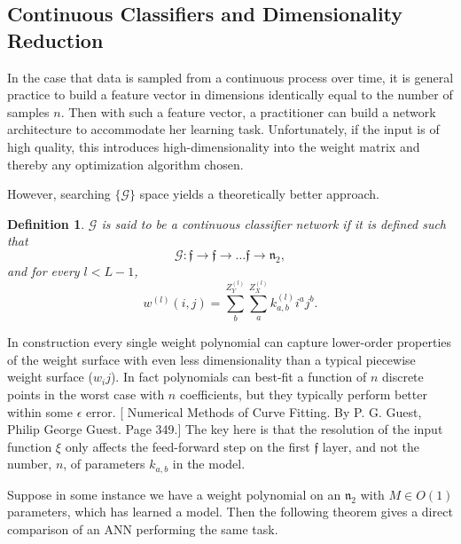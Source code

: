 \documentclass{article}
\newtheorem{definition}[theorem]{Definition}
\begin{document}
\subsection{Continuous Classifiers and Dimensionality Reduction}
In the case that data is sampled from a continuous process over time, it is general practice
to build a feature vector in dimensions identically equal to the number of samples $n$. Then with such a feature vector, a practitioner can build a network architecture to accommodate her learning task. Unfortunately, if the input is of high quality, this introduces high-dimensionality into the weight matrix and thereby any optimization algorithm chosen.




However, searching $\{\mathcal{G}\}$ space yields a theoretically better approach.
\begin{definition}
    $\mathcal{G}$ is said to be a continuous classifier network if it is defined such that
    \begin{equation}
        \mathcal{G}: \mathfrak{f} \to \mathfrak{f} \to \dots \mathfrak{f} \to \mathfrak{n}_2,
    \end{equation}
    and for every $l < L-1$,
    \begin{equation}
w^{(l)}(i,j) = 
    \sum_{b}^{Z^{(l)}_Y} \sum_{a}^{Z^{(l)}_X} k^{(l)}_{a,b}i^{a}j^{b}.
\end{equation}
\end{definition}
In construction every single weight polynomial can capture lower-order properties of the weight surface with even less
dimensionality than a typical piecewise weight surface ($w_ij$). In fact polynomials can best-fit a function of $n$ discrete points in the worst case with $n$ coefficients, but they typically perform better within some $\epsilon$ error.
[ Numerical Methods of Curve Fitting. By P. G. Guest, Philip George Guest. Page 349.]
The key here is that the resolution of the input function $\xi$ only affects the feed-forward step
on the first $\mathfrak{f}$ layer, and not the number, $n$, of parameters $k_{a,b}$ in the model.


Suppose in some instance we have a weight polynomial on an $\mathfrak{n}_2$ with $M \in O(1)$ parameters, which has learned a model. Then the following theorem gives a direct comparison of an ANN performing the same task.
\end{document}

